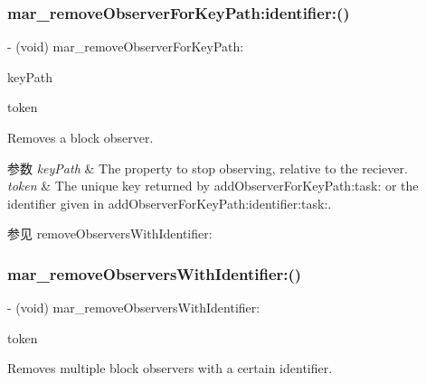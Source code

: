 \subsubsection{\texorpdfstring{mar\+\_\+remove\+Observer\+For\+Key\+Path\+:identifier\+:()}{mar\_removeObserverForKeyPath:identifier:()}}
{\footnotesize\ttfamily -\/ (void) mar\+\_\+remove\+Observer\+For\+Key\+Path\+: \begin{DoxyParamCaption}\item[{(N\+S\+String $\ast$)}]{key\+Path }\item[{identifier:(N\+S\+String $\ast$)}]{token }\end{DoxyParamCaption}}

Removes a block observer.


\begin{DoxyParams}{参数}
{\em key\+Path} & The property to stop observing, relative to the reciever. \\
\hline
{\em token} & The unique key returned by add\+Observer\+For\+Key\+Path\+:task\+: or the identifier given in add\+Observer\+For\+Key\+Path\+:identifier\+:task\+:. \\
\hline
\end{DoxyParams}
\begin{DoxySeeAlso}{参见}
remove\+Observers\+With\+Identifier\+: 
\end{DoxySeeAlso}
\mbox{\label{category_n_s_object_07_m_a_r___observer_08_aab88fd3fc6d1476c5bde5f68caefe557}} 
\subsubsection{\texorpdfstring{mar\+\_\+remove\+Observers\+With\+Identifier\+:()}{mar\_removeObserversWithIdentifier:()}}
{\footnotesize\ttfamily -\/ (void) mar\+\_\+remove\+Observers\+With\+Identifier\+: \begin{DoxyParamCaption}\item[{(N\+S\+String $\ast$)}]{token }\end{DoxyParamCaption}}

Removes multiple block observers with a certain identifier.


